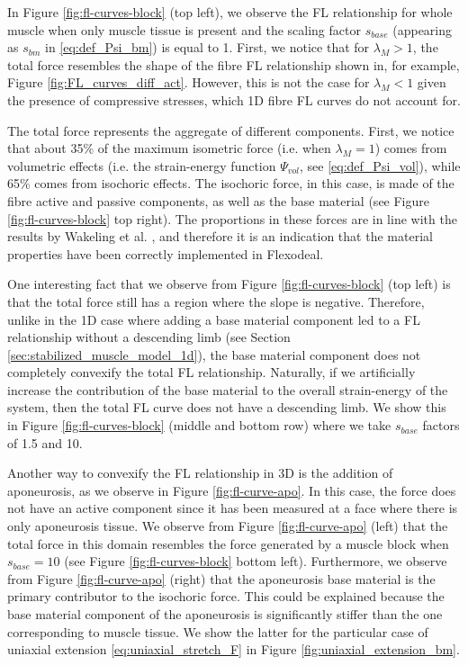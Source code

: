 \documentclass{sfuthesis}
\numberwithin{equation}{section}
\numberwithin{figure}{chapter}
\numberwithin{table}{chapter}
\theoremstyle{definition}
\begin{document}
In Figure \ref{fig:fl-curves-block} (top left), we observe the FL relationship for whole muscle when only muscle tissue is present and the scaling factor $s_{base}$ (appearing as $s_{bm}$ in \eqref{eq:def_Psi_bm}) is equal to 1. First, we notice that for $\lambda_M > 1$, the total force resembles the shape of the fibre FL relationship shown in, for example, Figure \ref{fig:FL_curves_diff_act}. However, this is not the case for $\lambda_M < 1$ given the presence of compressive stresses, which 1D fibre FL curves do not account for.

The total force represents the aggregate of different components. First, we notice that about 35\% of the maximum isometric force (i.e. when $\lambda_M = 1$) comes from volumetric effects (i.e. the strain-energy function $\Psi_{vol}$, see \eqref{eq:def_Psi_vol}), while 65\% comes from isochoric effects. The isochoric force, in this case, is made of the fibre active and passive components, as well as the base material (see Figure \ref{fig:fl-curves-block} top right). The proportions in these forces are in line with the results by Wakeling et al. \cite{Paper1_WakelingEtAl2020}, and therefore it is an indication that the material properties have been correctly implemented in Flexodeal.

One interesting fact that we observe from Figure \ref{fig:fl-curves-block} (top left) is that the total force still has a region where the slope is negative. Therefore, unlike in the 1D case where adding a base material component led to a FL relationship without a descending limb (see Section \ref{sec:stabilized_muscle_model_1d}), the base material component does not completely convexify the total FL relationship. Naturally, if we artificially increase the contribution of the base material to the overall strain-energy of the system, then the total FL curve does not have a descending limb. We show this in Figure \ref{fig:fl-curves-block} (middle and bottom row) where we take $s_{base}$ factors of 1.5 and 10.

Another way to convexify the FL relationship in 3D is the addition of aponeurosis, as we observe in Figure \ref{fig:fl-curve-apo}. In this case, the force does not have an active component since it has been measured at a face where there is only aponeurosis tissue. We observe from Figure \ref{fig:fl-curve-apo} (left) that the total force in this domain resembles the force generated by a muscle block when $s_{base} = 10$ (see Figure \ref{fig:fl-curves-block} bottom left).
Furthermore, we observe from Figure \ref{fig:fl-curve-apo} (right) that the aponeurosis base material is the primary contributor to the isochoric force. This could be explained because the base material component of the aponeurosis is significantly stiffer than the one corresponding to muscle tissue. We show the latter for the particular case of uniaxial extension \eqref{eq:uniaxial_stretch_F} in Figure \ref{fig:uniaxial_extension_bm}.
\end{document}
